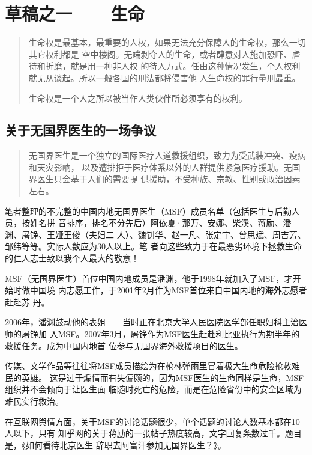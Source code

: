 \chapter{草稿之一——生命}

\begin{quotation}
  生命权是最基本，最重要的人权，如果无法充分保障人的生命权，那么一切其它权利都是
  空中楼阁。无端剥夺人的生命，或者肆意对人施加恐吓、虐待和折磨，就是用一种非人权
  的待人方式。任由这种情况发生，个人权利就无从谈起。所以一般各国的刑法都将侵害他
  人生命权的罪行量刑最重。

  生命权是一个人之所以被当作人类伙伴所必须享有的权利。\cite{renquanwiki}
\end{quotation}

\section{关于无国界医生的一场争议}

\begin{quotation}
  无国界医生是一个独立的国际医疗人道救援组织，致力为受武装冲突、疫病和天灾影响，
  以及遭排拒于医疗体系以外的人群提供紧急医疗援助。无国界医生只会基于人们的需要提
  供援助，不受种族、宗教、性别或政治因素左右。
\end{quotation}

笔者整理的不完整的中国内地无国界医生（MSF）成员名单（包括医生与后勤人员，按姓名拼
音排序，排名不分先后）阿依夏·那万、安娜、柴溪、蒋励、潘渊、屠铮、王娅王俊（夫妇二
人）、魏钊华、赵一凡、张定宇、曾思斌、周吉芳、邹纬等等。实际人数应为30人以上。笔
者向这些致力于在最恶劣环境下拯救生命的仁人志士致以我个人最大的敬意！

MSF（无国界医生）首位中国内地成员是潘渊，他于1998年就加入了MSF，才开始时做中国境
内志愿工作，于2001年2月作为MSF首位来自中国内地的\textbf{海外}志愿者赶赴苏
丹。\cite{panyuan}

2006年，潘渊鼓动他的表姐——当时正在北京大学人民医院医学部任职妇科主治医师的屠铮加
入MSF。2007年3月，屠铮作为MSF医生赶赴利比亚执行为期半年的救援任务。成为中国内地首
位参与无国界海外救援项目的医生。\cite{tuzheng}

传媒、文学作品等往往将MSF成员描绘为在枪林弹雨里冒着极大生命危险抢救难民的英雄。
这是过于煽情而有失偏颇的，因为MSF医生的生命同样是生命，MSF组织并不会倾向于让医生面
临随时死亡的危险，而是在危险省份中的安全区域为难民实行救治。

在互联网舆情方面，关于MSF的讨论话题很少，单个话题的讨论人数基本都在10人以下，只有
知乎网的关于蒋励的一张帖子热度较高，文字回复条数过千。题目是，《如何看待北京医生
辞职去阿富汗参加无国界医生？》。\cite{kandaijiangli}


